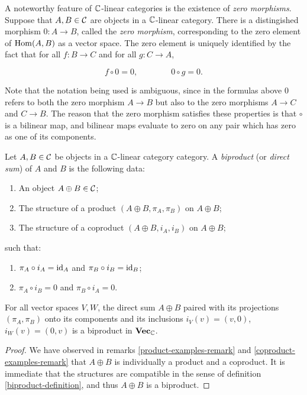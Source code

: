 \begin{rem} A noteworthy feature of ${\mathbb C}$-linear categories is the existence of {\em zero morphisms}. Suppose that $A,B\in {\mathcal C}$ are objects in a ${\mathbb C}$-linear category. There is a distingished morphism $0:A\to B$, called the {\em zero morphism}, corresponding to the zero element of $\operatorname{Hom}(A,B)$ as a vector space. The zero element is uniquely identified by the fact that for all $f:B\to C$ and for all $g:C\to A$,

$$ f\circ 0=0, \qquad\qquad 0\circ g=0.$$

Note that the notation being used is ambiguous, since in the formulas above $0$ refers to both the zero morphism $A\to B$ but also to the zero morphisms $A\to C$ and $C\to B$. The reason that the zero morphism satisfies these properties is that $\circ$ is a bilinear map, and bilinear maps evaluate to zero on any pair which has zero as one of its components.
\end{rem}

\begin{defn}[Biproduct]\label{biproduct-definition} Let $A,B\in {\mathcal C}$ be objects in a ${\mathbb C}$-linear category category. A {\em biproduct} (or {\em direct sum}) of $A$ and $B$ is the following data:

\begin{enumerate}
\item An object $A\oplus B\in {\mathcal C}$;
\item The structure of a product $(A\oplus B,\pi_A,\pi_B)$ on $A\oplus B$;
\item The structure of a coproduct $(A\oplus B,i_A,i_B)$ on $A\oplus B$;
\end{enumerate}

such that:

\begin{enumerate}
\item $\pi_A\circ i_A=\operatorname{id}_A$ and $\pi_B\circ i_B=\operatorname{id}_B$;
\item $\pi_A\circ i_B=0$ and $\pi_B\circ i_A=0$.
\end{enumerate}
\end{defn}

\begin{prop} For all vector spaces $V,W$, the direct sum $A\oplus B$ paired with its projections $(\pi_A,\pi_B)$ onto its components and its inclusions $i_V(v)=(v,0)$, $i_W(v)=(0,v)$ is a biproduct in ${\bf Vec}_{{\mathbb C}}$.
\end{prop}
\begin{proof} We have observed in remarks \ref{product-examples-remark} and \ref{coproduct-examples-remark} that $A\oplus B$ is individually a product and a coproduct. It is immediate that the structures are compatible in the sense of definition \ref{biproduct-definition}, and thus $A\oplus B$ is a biproduct.
\end{proof}

